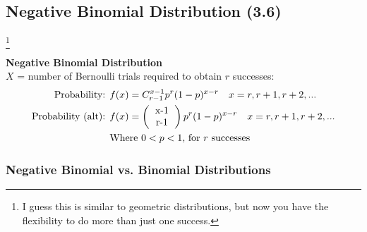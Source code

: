 \documentclass[../INDE315.tex]{subfiles}
\begin{document}
\subsection*{Negative Binomial Distribution (3.6)}
\footnote{I guess this is similar to geometric distributions, but now you have the flexibility to do more than just one success.}

\begin{defn}
    \textbf{Negative Binomial Distribution} \\
    $X$ = number of Bernoulli trials required to obtain $r$ successes:
    \begin{equation*}
        \begin{aligned}
            \text{Probability: } & f(x) = C^{x-1}_{r-1} p^r (1-p)^{x-r} \quad x = r,r + 1, r + 2,... \\
            \text{Probability (alt): } & f(x) = \left( \begin{tabular}{c}
                x-1 \\
                r-1
                \end{tabular}  \right) p^r (1-p)^{x-r} \quad x = r,r + 1, r + 2,... \\
            & \text{Where $0 < p < 1$, for $r$ successes}
        \end{aligned}
    \end{equation*}
\end{defn}

\subsubsection*{Negative Binomial vs. Binomial Distributions}
\end{document}
